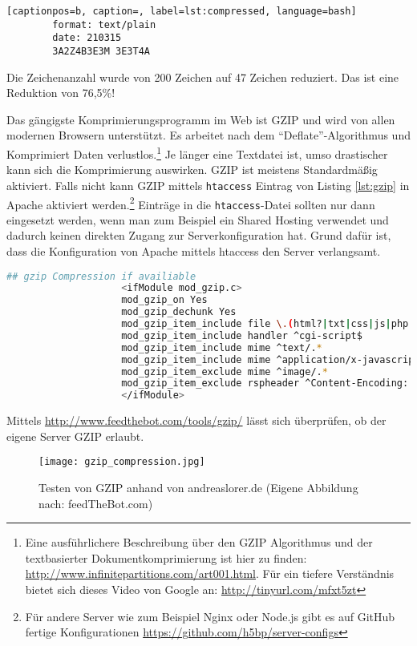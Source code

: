 				\begin{lstlisting}[captionpos=b, caption=, label=lst:compressed, language=bash]
		format: text/plain
		date: 210315
		3A2Z4B3E3M 3E3T4A
				\end{lstlisting}

				Die Zeichenanzahl wurde von 200 Zeichen auf 47 Zeichen reduziert. Das ist eine Reduktion von 76,5\%!			

				Das gängigste Komprimierungsprogramm im Web ist GZIP und wird von allen modernen Browsern unterstützt. Es arbeitet nach dem "`Deflate"'-Algorithmus und Komprimiert Daten verlustlos.\footnote{Eine ausführlichere Beschreibung über den GZIP Algorithmus und der textbasierter Dokumentkomprimierung ist hier zu finden: \url{http://www.infinitepartitions.com/art001.html}. Für ein tiefere Verständnis bietet sich dieses Video von Google an: \url{http://tinyurl.com/mfxt5zt}} Je länger eine Textdatei ist, umso drastischer kann sich die Komprimierung auswirken. GZIP ist meistens Standardmäßig aktiviert. Falls nicht kann GZIP mittels \texttt{htaccess} Eintrag von Listing \ref{lst:gzip} in Apache aktiviert werden.\footnote{Für andere Server wie zum Beispiel Nginx oder Node.js gibt es auf GitHub fertige Konfigurationen \url{https://github.com/h5bp/server-configs}} Einträge in die \texttt{htaccess}-Datei sollten nur dann eingesetzt werden, wenn man zum Beispiel ein Shared Hosting verwendet und dadurch keinen direkten Zugang zur Serverkonfiguration hat. Grund dafür ist, dass die Konfiguration von Apache mittels htaccess den Server verlangsamt.\autocite{apache}

				\begin{lstlisting}[captionpos=b, caption=GZIP htaccess Eintrag, label=lst:gzip, language=bash]
					## gzip Compression if availiable
					<ifModule mod_gzip.c>
					mod_gzip_on Yes
					mod_gzip_dechunk Yes
					mod_gzip_item_include file \.(html?|txt|css|js|php|pl)$
					mod_gzip_item_include handler ^cgi-script$
					mod_gzip_item_include mime ^text/.*
					mod_gzip_item_include mime ^application/x-javascript.*
					mod_gzip_item_exclude mime ^image/.*
					mod_gzip_item_exclude rspheader ^Content-Encoding:.*gzip.*
					</ifModule>
				\end{lstlisting}

				Mittels \url{http://www.feedthebot.com/tools/gzip/} lässt sich überprüfen, ob der eigene Server GZIP erlaubt.

				\begin{figure}[htbp]
					\begin{center}
						\texttt{[image: gzip\_compression.jpg]}
						\caption{Testen von GZIP anhand von andreaslorer.de (Eigene Abbildung nach: feedTheBot.com)}
						\label{fig:gzip_compression}
					\end{center}
				\end{figure}

